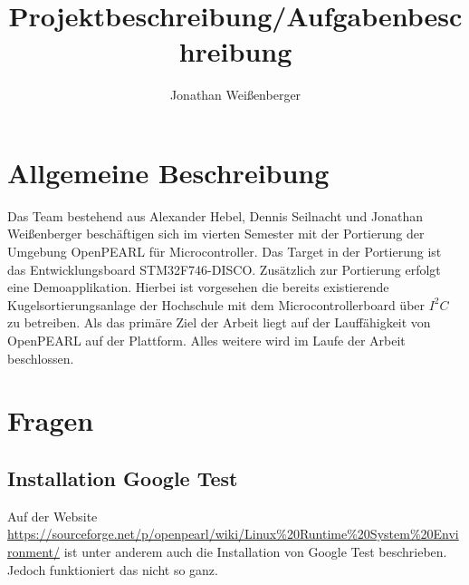 \documentclass[12pt,a4paper]{article}
\author{Jonathan Weißenberger}
\title{Projektbeschreibung/Aufgabenbeschreibung}
\begin{document}
\maketitle
\newpage
\tableofcontents
\newpage
\section{Allgemeine Beschreibung}
Das Team bestehend aus Alexander Hebel, Dennis Seilnacht und Jonathan Weißenberger beschäftigen sich im vierten Semester mit der Portierung der Umgebung OpenPEARL für Microcontroller. Das Target in der Portierung ist das Entwicklungsboard STM32F746-DISCO. Zusätzlich zur Portierung erfolgt eine Demoapplikation. Hierbei ist vorgesehen die bereits existierende Kugelsortierungsanlage der Hochschule mit dem Microcontrollerboard über $I^2C$ zu betreiben.
Als das primäre Ziel der Arbeit liegt auf der Lauffähigkeit von OpenPEARL auf der Plattform. Alles weitere wird im Laufe der Arbeit beschlossen.
\section{Fragen}
\subsection{Installation Google Test}
Auf der Website \url{https://sourceforge.net/p/openpearl/wiki/Linux%20Runtime%20System%20Environment/} ist unter anderem auch die Installation von Google Test beschrieben. Jedoch funktioniert das nicht so ganz. 
\end{document}
